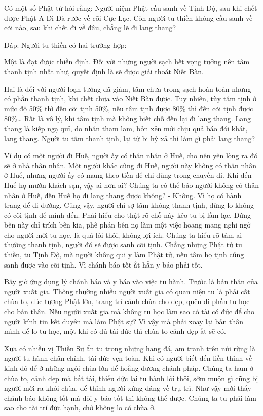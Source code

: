 \documentclass[
  12pt,
  oneside]{book}
\begin{document}
Có một số Phật tử hỏi rằng: Người niệm Phật cầu sanh về Tịnh Độ, sau khi chết được Phật A Di Đà rước về cõi Cực Lạc. Còn người tu thiền không cầu sanh về cõi nào, sau khi chết đi về đâu, chẳng lẽ đi lang thang?

Đáp: Người tu thiền có hai trường hợp:

Một là đạt được thiền định. Đối với những người sạch hết vọng tưởng nên tâm thanh tịnh nhất như, quyết định là sẽ được giải thoát Niết Bàn.

Hai là đối với người loạn tưởng đã giảm, tâm chưa trong sạch hoàn toàn nhưng có phần thanh tịnh, khi chết chưa vào Niết Bàn được. Tuy nhiên, tùy tâm tịnh ở mức độ 50\% thì đến cõi tịnh 50\%, nếu tâm tịnh được 80\% thì đến cõi tịnh được 80\%\ldots{} Rất là vô lý, khi tâm tịnh mà không biết chỗ đến lại đi lang thang. Lang thang là kiếp ngạ quỉ, do nhân tham lam, bỏn xẻn mới chịu quả báo đói khát, lang thang. Người tu tâm thanh tịnh, lại từ bi hỷ xả thì làm gì phải lang thang?

Ví dụ có một người đi Huế, người ấy có thân nhân ở Huế, cho nên yên lòng ra đó sẽ ở nhà thân nhân. Một người khác cũng đi Huế, người này không có thân nhân ở Huế, nhưng người ấy có mang theo tiền để chi dùng trong chuyến đi. Khi đến Huế họ mướn khách sạn, vậy ai hơn ai? Chúng ta có thể bảo người không có thân nhân ở Huế, đến Huế họ đi lang thang được không? - Không. Vì họ có hành trang để đi đường. Cũng vậy, người chỉ sợ tâm không thanh tịnh, đừng lo không có cõi tịnh để mình đến. Phải hiểu cho thật rõ chỗ này kẻo tu bị lầm lạc. Đứng bên này chỉ trích bên kia, phê phán bên nọ làm một việc hoang mang nghi ngờ cho người mới tu học, là quá lôi thôi, không lợi ích. Chúng ta hiểu rõ tâm ai thường thanh tịnh, người đó sẽ được sanh cõi tịnh. Chẳng những Phật tử tu thiền, tu Tịnh Độ, mà người không qui y làm Phật tử, nếu tâm họ tịnh cũng sanh được vào cõi tịnh. Vì chánh báo tốt ắt hẳn y báo phải tốt.

Bây giờ ứng dụng lý chánh báo và y báo vào việc tu hành. Trước là bản thân của người xuất gia. Thông thường nhiều người xuất gia có quan niện tu là phải cất chùa to, đúc tượng Phật lớn, trang trí cảnh chùa cho đẹp, quên đi phần tu học cho bản thân. Nếu người xuất gia mà không tu học làm sao có tài có đức để cho người kính tin kết duyên mà làm Phật sự? Vì vậy mà phải xoay lại bản thân mình để lo tu học, một khi có đủ tài đức thì chùa to cảnh đẹp ắt sẽ có.

Xưa có nhiều vị Thiền Sư ẩn tu trong những hang đá, am tranh trên núi rừng là người tu hành chân chính, tài đức vẹn toàn. Khi có người biết đến liền thỉnh về kinh đô để ở những ngôi chùa lớn để hoằng dương chánh pháp. Chúng ta ham ở chùa to, cảnh đẹp mà bất tài, thiếu đức lại tu hành lôi thôi, sớm muộn gì cũng bị người mời ra khỏi chùa, để thỉnh người xứng đáng về trụ trì. Như vậy mới thấy chánh báo không tốt mà đòi y báo tốt thì không thể được. Chúng ta tu phải làm sao cho tài trí đức hạnh, chớ không lo có chùa ở.
\end{document}
